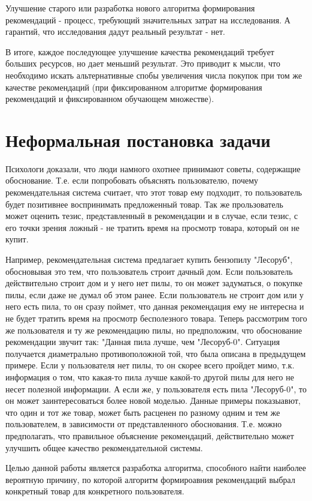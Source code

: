 \documentclass[12pt,a4paper]{report}
\begin{document}
Улучшение старого или разработка нового алгоритма формирования рекомендаций - процесс, требующий значительных затрат на исследования. А гарантий, что исследования дадут реальный результат - нет.

В итоге, каждое последующее улучшение качества рекомендаций требует больших ресурсов, но дает меньший результат.
Это приводит к мысли, что  необходимо искать альтернативные спобы увеличения числа покупок при том же качестве рекомендаций (при фиксированном алгоритме формирования рекомендаций и фиксированном обучающем множестве).

\section{Неформальная постановка задачи}
Психологи доказали, что люди намного охотнее принимают советы, содержащие обоснование. Т.е. если попробовать объяснять пользователю, почему рекомендательная система считает, что этот товар ему подходит, то пользователь будет позитивнее воспринимать предложенный товар. Так же прользователь может оценить тезис, представленный в рекомендации и в случае, если тезис, с его точки зрения ложный - не тратить время на просмотр товара, который он не купит.

Например, рекомендательная система предлагает купить бензопилу "Лесоруб", обосновывая это тем, что пользователь строит дачный дом. Если пользователь действительно строит дом и у него нет пилы, то он может задуматься, о покупке пилы, если даже не думал об этом ранее. Если пользователь не строит дом или у него есть пила, то он сразу поймет, что данная рекомендация ему не интересна и не будет тратить время на просмотр бесполезного товара.
Теперь рассмотрим того же пользователя и ту же рекомендацию пилы, но предположим, что обоснование рекомендации звучит так: "Данная пила лучше, чем "Лесоруб-0".
Ситуация получается диаметрально противоположной той, что была описана в предыдущем примере. Если у пользователя нет пилы, то он скорее всего пройдет мимо, т.к. информация о том, что какая-то пила лучше какой-то другой пилы для него не несет полезной информации. А если же, у пользователя есть пила "Лесоруб-0", то он может заинтересоваться более новой моделью.
Данные примеры показыавют, что один и тот же товар, может быть расценен по разному одним и тем же пользователем, в зависимости от представленного обоснования. Т.е. можно предполагать, что правильное объяснение рекомендаций, действительно может улучшить общее качество рекомендательной системы.

Целью данной работы является разработка алгоритма, способного найти наиболее вероятную причину, по которой алгоритм формироавния рекомендаций выбрал конкретный товар для конкретного пользователя.
\end{document}
